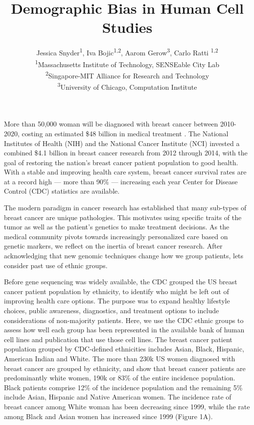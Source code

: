 \documentclass[11pt]{article}
\begin{document}
\title{Demographic Bias in Human Cell Studies }
\author{Jessica Snyder\textsuperscript{1}, Iva Bojic\textsuperscript{1,2}, Aarom Gerow\textsuperscript{3}, Carlo Ratti  \textsuperscript{1,2 } \\ \textsuperscript{1}Massachusetts Institute of Technology, SENSEable City Lab \\ \textsuperscript{2}Singapore-MIT Alliance for Research and Technology \\  \textsuperscript{3}University of Chicago, Computation Institute }

\maketitle 

More than 50,000 woman will be diagnosed with breast cancer between 2010-2020, costing an estimated \$48 billion in medical treatment \cite{mariotto2011projections, weir2015past}. The National Institutes of Health (NIH) and the National Cancer Institute (NCI) invested a combined \$4.1 billion in breast cancer research from 2012 through 2014, with the goal of restoring the nation's breast cancer patient population to good health. With a stable and improving health care system, breast cancer survival rates are at a record high --- more than 90\% --- increasing each year Center for Disease Control (CDC) statistics are available. 

The modern paradigm in cancer research has established that many sub-types of breast cancer are unique pathologies. This motivates using specific traits of the tumor as well as the patient's genetics to make treatment decisions. As the medical community pivots towards increasingly personalized care based on genetic markers, we reflect on the inertia of breast cancer research. After acknowledging that new genomic techniques change how we group patients, lets consider past use of ethnic groups. 

Before gene sequencing was widely available, the CDC grouped the US breast cancer patient population by ethnicity, to identify who might be left out of improving health care options. The purpose was to expand healthy lifestyle choices, public awareness, diagnostics, and treatment options to include considerations of non-majority patients. Here, we use the CDC ethnic groups to assess how well each group has been represented in the available bank of human cell lines and publication that use those cell lines. The breast cancer patient population grouped by CDC-defined ethnicities includes Asian, Black, Hispanic, American Indian and White. The more than 230k US women diagnosed with breast cancer are grouped by ethnicity, and show that breast cancer patients are predominantly white women, 190k or 83\% of the entire incidence population. Black patients comprise 12\% of the incidence population and the remaining 5\% include Asian, Hispanic and Native American women. The incidence rate of breast cancer among White woman has been decreasing since 1999, while the rate among Black and Asian women has increased since 1999 (Figure 1A).
\end{document}
